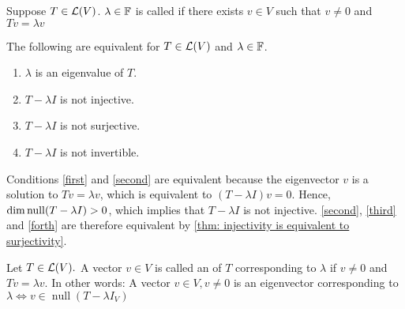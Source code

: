 \begin{mydef} [eigenvalue]
  Suppose $T\in \mathcal{L} (V)$. $\lambda \in \mathbb{F}$ is called  if there exists $v \in V$ such that $v \neq 0$ and $Tv = \lambda v$
\end{mydef}

\setcounter{thm}{6}
\begin{thm} 
  \label{thm: equivalent conditions to be an eigenvalue}
  The following are equivalent for $T \in \mathcal{L}(V)$ and $\lambda \in \mathbb{F}$.
  \begin{enumerate}[label=\textbf{(\alph*)}]
    \item $\lambda$ is an eigenvalue of $T$. \label{first}
    \item $T-\lambda I$ is not injective. \label{second}
    \item $T-\lambda I$ is not surjective. \label{third}
    \item $T-\lambda I$ is not invertible. \label{forth}
  \end{enumerate}
\end{thm}
\begin{prf}
  Conditions \ref{first} and \ref{second} are equivalent because the eigenvector $v$ is a solution to $Tv=\lambda v$, which is equivalent to $(T-\lambda I)v=0$. Hence, $\dim \operatorname{null} (T-\lambda I) > 0$, which implies that $T-\lambda I$ is not injective.
  \ref{second}, \ref{third} and \ref{forth} are therefore equivalent by
  \ref{thm: injectivity is equivalent to surjectivity}.
\end{prf}

\setcounter{thm}{7}
\begin{mydef} [eigenvector]
  Let $T\in \mathcal{L}(V).$ A vector $v \in V$ is called an  of $T$ corresponding to $\lambda$ if $v\neq 0$ and $Tv = \lambda v$.
  In other words:
  A vector $v\in V, v \neq 0$ is an eigenvector corresponding to $\lambda \iff v \in \operatorname{null}(T-\lambda I_V)$
\end{mydef}

